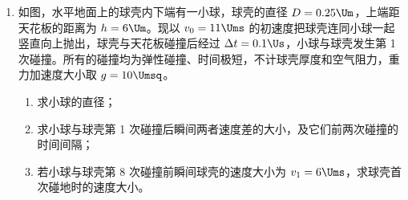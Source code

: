 \documentclass[\gkver]{gaokaozhenti}
\begin{document}
\begin{enumerate}
{可得垂直电场方向位移 $y=v_{\perp}t_{3}=\frac{4U_{1}d_{2}\sin\theta\cos\theta}{U_{2}}$

与离子比荷无关，结合沿电场方向最大位移与比荷无关，可得出所有正离子均从同一点射出反射电场。

（2）在加速电场中，根据位移时间关系 $d_{1}=\frac{1}{2}a't_{1}^{2}$

其中 $a'=\frac{qU_{1}}{md_{1}}$

可得加速电场中运动时间 $t_{1}=d_{1}\sqrt{\frac{2m}{qU_{1}}}$

无场区运动时间 $t_{2}=\frac{s_{0}}{v}=s_{0}\sqrt{\frac{m}{2qU_{1}}}$

离子从 O 到射出反射电场所用时间 $t=t_{1}+t_{2}+t_{3}=d_{1}\sqrt{\frac{2m}{qU_{1}}}+s_{0}\sqrt{\frac{m}{2qU_{1}}}+\frac{2d_{2}\cos\theta}{U_{2}}\sqrt{\frac{2mU_{1}}{q}}$

可知 $t\propto\sqrt{\frac{m}{q}}$，即 $\frac{\tau_{1}}{\tau_{2}}=\sqrt{\frac{\alpha_{2}}{\alpha_{1}}}$

可得 $\frac{\alpha_{1}}{\alpha_{2}}=\frac{9}{4}$
}

\item
如图，水平地面上的球壳内下端有一小球，球壳的直径 $D=0.25\Um$，上端距天花板的距离为 $h=6\Um$。现以 $v_{0}=11\Ums$ 的初速度把球壳连同小球一起竖直向上抛出，球壳与天花板碰撞后经过 $\Delta t=0.1\Us$，小球与球壳发生第 1 次碰撞。所有的碰撞均为弹性碰撞、时间极短，不计球壳厚度和空气阻力，重力加速度大小取 $g=10\Umsq$。
\begin{enumerate}
	\item
	求小球的直径；
	\item
	求小球与球壳第 1 次碰撞后瞬间两者速度差的大小，及它们前两次碰撞的时间间隔；
	\item
	若小球与球壳第 8 次碰撞前瞬间球壳的速度大小为 $v_{1}=6\Ums$，求球壳首次碰地时的速度大小。
\end{enumerate}
\onepicture[align=right, h=3.15cm]{}

\end{enumerate}
\end{document}
